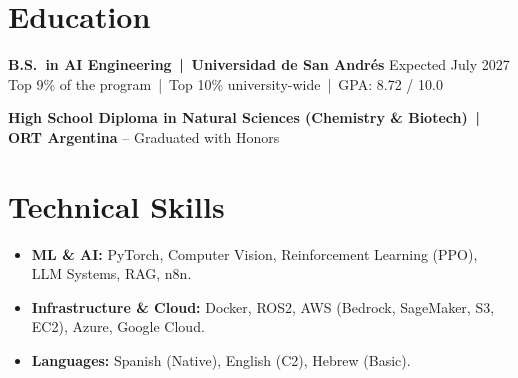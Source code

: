 \documentclass[a4paper,10.5pt]{article}
\begin{document}
\section*{Education}

\textbf{B.S.\ in AI Engineering \,|\, Universidad de San Andrés} \hfill Expected July 2027\\
Top 9\% of the program \,|\, Top 10\% university-wide \,|\, GPA: 8.72 / 10.0

\smallskip
\textbf{High School Diploma in Natural Sciences (Chemistry \& Biotech) \,|\, ORT Argentina} -- Graduated with Honors

\section*{Technical Skills}

\begin{itemize}
    \item \textbf{ML \& AI:} PyTorch, Computer Vision, Reinforcement Learning (PPO), LLM Systems, RAG, n8n.
    \item \textbf{Infrastructure \& Cloud:} Docker, ROS2, AWS (Bedrock, SageMaker, S3, EC2), Azure, Google Cloud.
    \item \textbf{Languages:} Spanish (Native), English (C2), Hebrew (Basic).
\end{itemize}
\end{document}
